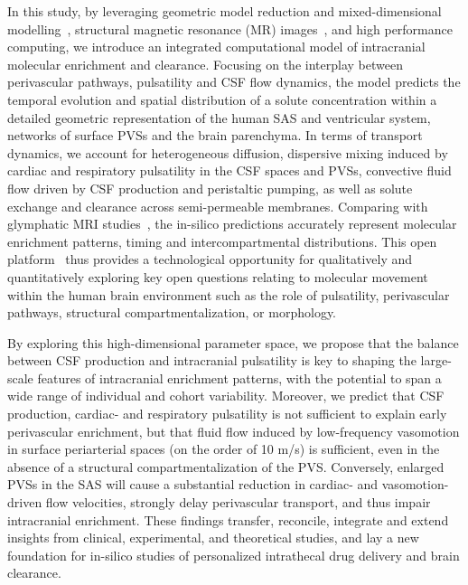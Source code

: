 \documentclass[fleqn,10pt]{wlscirep}
\begin{document}
In this study, by leveraging geometric model reduction and
mixed-dimensional modelling~\cite{masri2024modelling}, structural
magnetic resonance (MR) images~\cite{hodneland2019new}, and high
performance computing, we introduce an integrated computational model
of intracranial molecular enrichment and clearance. Focusing on the
interplay between perivascular pathways, pulsatility and CSF flow
dynamics, the model predicts the temporal evolution and spatial
distribution of a solute concentration within a detailed geometric
representation of the human SAS and ventricular system, networks of
surface PVSs and the brain parenchyma. In terms of transport dynamics,
we account for heterogeneous diffusion, dispersive mixing induced by
cardiac and respiratory pulsatility in the CSF spaces and PVSs,
convective fluid flow driven by CSF production and peristaltic
pumping, as well as solute exchange and clearance across
semi-permeable membranes. Comparing with glymphatic MRI
studies~\cite{ringstad2017glymphatic, ringstad2018brain,
  watts2019measuring}, the in-silico predictions accurately represent
molecular enrichment patterns, timing and intercompartmental
distributions. This open platform~\cite{ZENODO} thus provides a
technological opportunity for qualitatively and quantitatively
exploring key open questions relating to molecular movement within the
human brain environment such as the role of pulsatility, perivascular
pathways, structural compartmentalization, or morphology.

By exploring this high-dimensional parameter space, we propose that
the balance between CSF production and intracranial pulsatility is key
to shaping the large-scale features of intracranial enrichment
patterns, with the potential to span a wide range of individual and
cohort variability. Moreover, we predict that CSF production, cardiac-
and respiratory pulsatility is not sufficient to explain early
perivascular enrichment, but that fluid flow induced by low-frequency
vasomotion in surface periarterial spaces (on the order of 10 \textmu
m/s) is sufficient, even in the absence of a structural
compartmentalization of the PVS. Conversely, enlarged PVSs in the SAS
will cause a substantial reduction in cardiac- and vasomotion-driven
flow velocities, strongly delay perivascular transport, and thus
impair intracranial enrichment. These findings transfer, reconcile,
integrate and extend insights from clinical, experimental, and
theoretical studies, and lay a new foundation for in-silico studies of
personalized intrathecal drug delivery and brain clearance.
\end{document}
